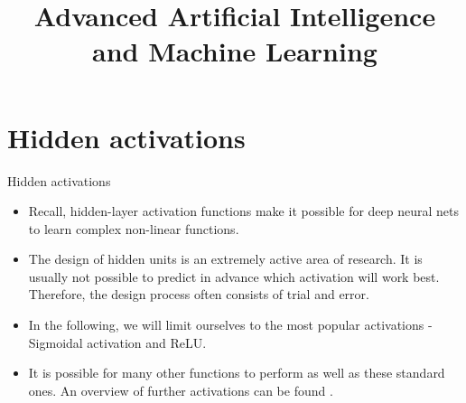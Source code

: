 




\newcommand{\titlefigure}{figure/leakyrelu_deriv.png}
\newcommand{\learninggoals}{
  \item Common activation functions for hidden units (sigmoid, tanh, ReLU and its variants) and the vanishing-gradient/saturation issues they address
  \item Output activations and their connection to loss functions via maximum likelihood
  \item Standard loss functions for regression (L2, L1) and classification (cross-entropy, softmax)
  \item Regularized risk minimization: norm penalties and weight decay
  \item Early stopping as an implicit regularizer, and its relationship to L2 regularization
  \item Ensemble methods, dropout, and data augmentation as further regularization techniques
}

\title{Advanced Artificial Intelligence and Machine Learning}
\date{}




\section{Hidden activations}

\begin{frame}{Hidden activations}
  \begin{itemize}
  \item Recall, hidden-layer activation functions make it possible for deep neural nets to learn complex non-linear functions.
  \item The design of hidden units is an extremely active area of research. 
   It is usually not possible to predict in advance which activation will work best. Therefore, the design process often consists of trial and error.
  \item In the following, we will limit ourselves to the most popular activations - Sigmoidal activation and ReLU.
  \item It is possible for many other functions to perform as well as these standard ones. An overview of further activations can be found \href{https://medium.com/@himanshuxd/activation-functions-sigmoid-relu-leaky-relu-and-softmax-basics-for-neural-networks-and-deep-8d9c70eed91e}{}.
  \end{itemize}
\end{frame}

